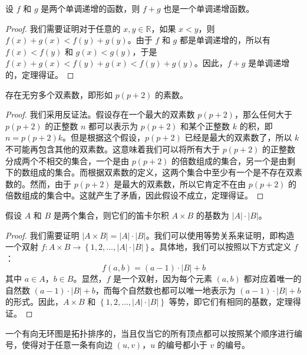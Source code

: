 \begin{prop}
    设 $f$ 和 $g$ 是两个单调递增的函数，则 $f+g$ 也是一个单调递增函数。
\end{prop}

\begin{proof}
    我们需要证明对于任意的 $x,y \in \mathbb{R}$，如果 $x < y$，则 $f(x)+g(x) < f(y)+g(y)$。由于 $f$ 和 $g$ 都是单调递增的，所以有 $f(x) < f(y)$ 和 $g(x) < g(y)$，于是 $f(x)+g(x) < f(y)+g(x) < f(y)+g(y)$。因此，$f+g$ 是单调递增的，定理得证。
\end{proof}

\begin{conj}
    存在无穷多个双素数，即形如 $p(p+2)$ 的素数。
\end{conj}

\begin{proof}
    我们采用反证法。假设存在一个最大的双素数 $p(p+2)$，那么任何大于 $p(p+2)$ 的正整数 $n$ 都可以表示为 $p(p+2)$ 和某个正整数 $k$ 的积，即 $n = p(p+2)k$。但是根据这个假设，$p(p+2)$ 已经是最大的双素数了，所以 $k$ 不可能再包含其他的双素数。这意味着我们可以将所有大于 $p(p+2)$ 的正整数分成两个不相交的集合，一个是由 $p(p+2)$ 的倍数组成的集合，另一个是由剩下的数组成的集合。而根据双素数的定义，这两个集合中至少有一个是不存在双素数的。然而，由于 $p(p+2)$ 是最大的双素数，所以它肯定不在由 $p(p+2)$ 的倍数组成的集合中。这就产生了矛盾，因此假设不成立，定理得证。
\end{proof}

\begin{assume}
    假设 $A$ 和 $B$ 是两个集合，则它们的笛卡尔积 $A \times B$ 的基数为 $|A| \cdot |B|$。
\end{assume}

\begin{proof}
    我们需要证明 $|A \times B| = |A| \cdot |B|$。我们可以使用等势关系来证明，即构造一个双射 $f: A \times B \rightarrow \left\{1,2,\dots,|A| \cdot |B|\right\}$。具体地，我们可以按照以下方式定义 $f$：
    \begin{equation}
        f(a,b)=(a-1)\cdot |B|+b
    \end{equation}
    其中 $a \in A$，$b \in B$。显然，$f$ 是一个双射，因为每个元素 $(a,b)$ 都对应着唯一的自然数 $(a-1) \cdot |B| + b$，而每个自然数也都可以唯一地表示为 $(a-1) \cdot |B| + b$ 的形式。因此，$A \times B$ 和 $\left\{1,2,\dots,|A| \cdot |B|\right\}$ 等势，即它们有相同的基数，定理得证。
\end{proof}

\begin{dfn}
    一个有向无环图是拓扑排序的，当且仅当它的所有顶点都可以按照某个顺序进行编号，使得对于任意一条有向边 $(u,v)$，$u$ 的编号都小于 $v$ 的编号。
\end{dfn}


